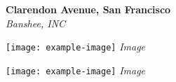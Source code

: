 \documentclass[letterpaper]{article}
\begin{document}
\begin{center}
    {\huge \textbf{ Clarendon Avenue, San Francisco}}\\
    \vspace{0.1cm}
    {\large \textit{Banshee, INC}}
\end{center}

\begin{multicols}{2}

\lipsum[1-2]
\begin{center}
    \texttt{[image: example-image]} %
    \textit{Image}
\end{center}



\lipsum[3-4]



\lipsum[5-9]

\begin{center}
    \texttt{[image: example-image]} %
    \textit{Image}
\end{center}

\end{multicols}
\end{document}
